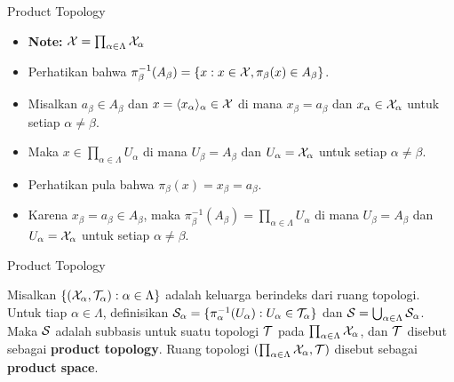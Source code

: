     \begin{frame}{Product Topology}
        \begin{itemize}
            \item \textbf{Note:} $\mathcal{X} = \prod_{\alpha\in\Lambda} \mathcal{X}_\alpha$
            \item Perhatikan bahwa $\pi_{\beta}^{-1}(A_\beta) = \{x : x\in \mathcal{X}, \pi_\beta(x)\in A_\beta\}$.
            \item Misalkan $a_\beta\in A_\beta$ dan $x = \langle x_\alpha\rangle_\alpha\in\mathcal{X}$ di mana $x_\beta = a_\beta$ dan $x_\alpha\in \mathcal{X}_\alpha$ untuk setiap $\alpha\neq\beta$.
            \item Maka $x\in\prod_{\alpha\in\Lambda} U_\alpha$ di mana $U_\beta = A_\beta$ dan $U_\alpha = \mathcal{X}_\alpha$ untuk setiap $\alpha\neq\beta$.
            \item Perhatikan pula bahwa $\pi_\beta(x) = x_\beta = a_\beta$.
            \item Karena $x_\beta = a_\beta\in A_\beta$, maka $\pi_{\beta}^{-1}(A_\beta) = \prod_{\alpha\in\Lambda} U_\alpha$ di mana $U_\beta = A_\beta$ dan $U_\alpha = \mathcal{X}_\alpha$ untuk setiap $\alpha\neq\beta$.
        \end{itemize}
    \end{frame}
    
    \begin{frame}{Product Topology}
        \begin{tcolorbox}[enhanced,title=Product Topology,frame style tile = {width=\paperwidth}{wallpaper}]
            Misalkan $\{(\mathcal{X}_\alpha,\mathcal{T}_\alpha):\alpha\in\Lambda\}$ adalah keluarga berindeks dari ruang topologi. Untuk tiap $\alpha\in\Lambda$, definisikan $\mathcal{S}_\alpha = \{\pi_\alpha^{-1}(U_\alpha):U_\alpha\in\mathcal{T}_\alpha\}$ dan $\mathcal{S} = \bigcup_{\alpha\in\Lambda} \mathcal{S}_\alpha$. Maka $\mathcal{S}$ adalah subbasis untuk suatu topologi $\mathcal{T}$ pada $\prod_{\alpha\in\Lambda} \mathcal{X}_\alpha$, dan $\mathcal{T}$ disebut sebagai \textbf{product topology}. Ruang topologi $(\prod_{\alpha\in\Lambda}\mathcal{X}_\alpha,\mathcal{T})$ disebut sebagai \textbf{product space}.
        \end{tcolorbox}
    \end{frame}
    
